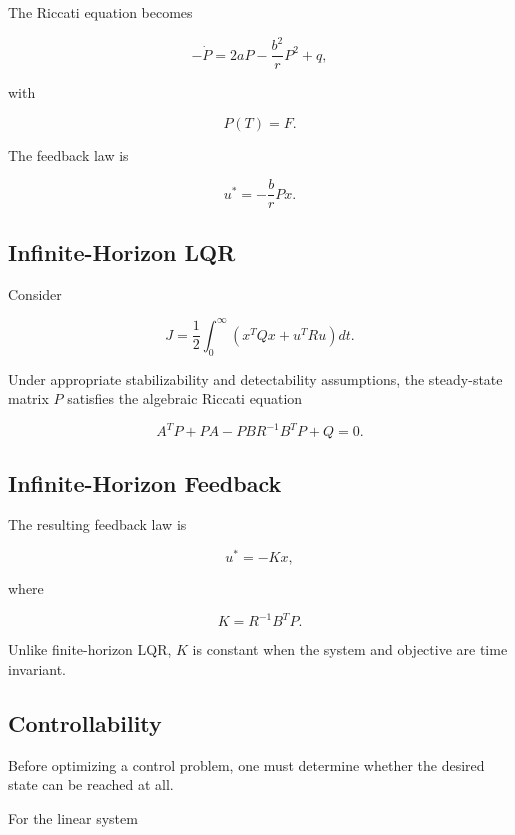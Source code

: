 The Riccati equation becomes

\[
\boxed{
-\dot{P}
=
2aP
-
\frac{b^2}{r}P^2
+
q,
}
\]

with

\[
\boxed{
P(T)=F.
}
\]

The feedback law is

\[
\boxed{
u^*
=
-
\frac{b}{r}
Px.
}
\]

\subsection{Infinite-Horizon LQR}
\label{subsec:infinite-horizon-lqr}

Consider

\[
\boxed{
J
=
\frac12
\int_0^\infty
\left(
x^TQx
+
u^TRu
\right)dt.
}
\]

Under appropriate stabilizability and detectability assumptions, the
steady-state matrix \(P\) satisfies the algebraic Riccati equation

\[
\boxed{
A^TP
+
PA
-
PBR^{-1}B^TP
+
Q
=
0.
}
\]

\subsection{Infinite-Horizon Feedback}
\label{subsec:infinite-horizon-feedback}

The resulting feedback law is

\[
\boxed{
u^*
=
-Kx,
}
\]

where

\[
\boxed{
K
=
R^{-1}B^TP.
}
\]

Unlike finite-horizon LQR, \(K\) is constant when the system and objective
are time invariant.

\subsection{Controllability}
\label{subsec:optimal-control-controllability}

Before optimizing a control problem, one must determine whether the desired
state can be reached at all.

For the linear system

